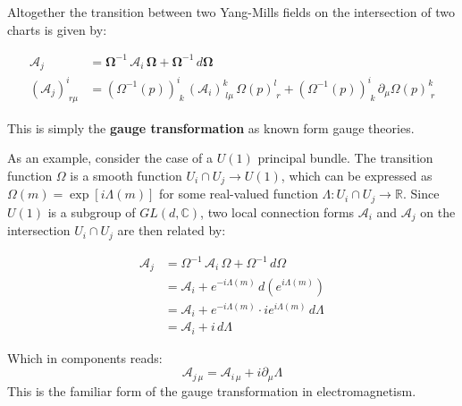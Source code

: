 Altogether the transition between two Yang-Mills fields on the intersection of two charts is given by:

\begin{align*}
\mathbf{\mathcal{A}}_j 
&= \mathbf{\Omega}^{-1} \, \mathbf{\mathcal{A}}_i \, \mathbf{\Omega} 
  + \mathbf{\Omega}^{-1} \,  d \mathbf{\Omega} \\
(\mathcal{A}_j)^i_{\; r \mu} 
&= \left( \Omega^{-1}(p) \right)^i_{\; k} \, (\mathcal{A}_i)^k_{\; l \mu} \, \Omega(p)^l_{\; r}
+ \left( \Omega^{-1}(p) \right)^i_{\; k} \, \partial_\mu \Omega(p)^k_{\; r}
\end{align*}

This is simply the \textbf{gauge transformation} as known form gauge theories\cite{NakaharaGeometrytopologyphysics2005}.

As an example, consider the case of a $U(1)$ principal bundle. The transition function \( \Omega \) is a smooth function \( U_i \cap U_j \longrightarrow U(1) \), which can be expressed as \( \Omega(m) = \exp[i\Lambda(m)] \) for some real-valued function \( \Lambda: U_i \cap U_j \longrightarrow \mathbb{R} \). Since $U(1)$ is a subgroup of $GL(d,\mathbb{C})$, two local connection forms \( \mathcal{A}_i \) and \( \mathcal{A}_j \) on the intersection \( U_i \cap U_j \) are then related by:

\begin{align*}
  \mathcal{A}_j 
  &= \Omega^{-1} \, \mathcal{A}_i \, \Omega + \Omega^{-1} \, d\Omega \\
  &= \mathcal{A}_i + e^{-i\Lambda(m)} \, d\left( e^{i\Lambda(m)} \right) \\
  &= \mathcal{A}_i + e^{-i\Lambda(m)} \cdot i e^{i\Lambda(m)} \, d\Lambda \\
  &= \mathcal{A}_i + i \, d\Lambda
\end{align*}

Which in components reads:
\[ \mathcal{A}_{j \, \mu} = \mathcal{A}_{i \, \mu} + i\partial_\mu \Lambda \]
This is the familiar form of the gauge transformation in electromagnetism\cite{NakaharaGeometrytopologyphysics2005}.

